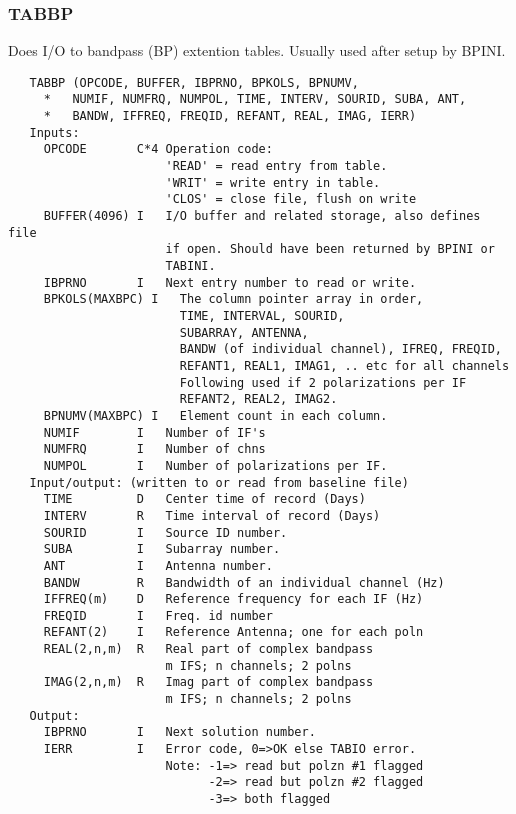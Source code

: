 \subsubsection{TABBP}
Does I/O to bandpass (BP) extention tables. Usually used after
setup by BPINI.
\begin{verbatim}
   TABBP (OPCODE, BUFFER, IBPRNO, BPKOLS, BPNUMV,
     *   NUMIF, NUMFRQ, NUMPOL, TIME, INTERV, SOURID, SUBA, ANT,
     *   BANDW, IFFREQ, FREQID, REFANT, REAL, IMAG, IERR)
   Inputs:
     OPCODE       C*4 Operation code:
                      'READ' = read entry from table.
                      'WRIT' = write entry in table.
                      'CLOS' = close file, flush on write
     BUFFER(4096) I   I/O buffer and related storage, also defines file
                      if open. Should have been returned by BPINI or
                      TABINI.
     IBPRNO       I   Next entry number to read or write.
     BPKOLS(MAXBPC) I   The column pointer array in order,
                        TIME, INTERVAL, SOURID,
                        SUBARRAY, ANTENNA,
                        BANDW (of individual channel), IFREQ, FREQID,
                        REFANT1, REAL1, IMAG1, .. etc for all channels
                        Following used if 2 polarizations per IF
                        REFANT2, REAL2, IMAG2.
     BPNUMV(MAXBPC) I   Element count in each column.
     NUMIF        I   Number of IF's
     NUMFRQ       I   Number of chns
     NUMPOL       I   Number of polarizations per IF.
   Input/output: (written to or read from baseline file)
     TIME         D   Center time of record (Days)
     INTERV       R   Time interval of record (Days)
     SOURID       I   Source ID number.
     SUBA         I   Subarray number.
     ANT          I   Antenna number.
     BANDW        R   Bandwidth of an individual channel (Hz)
     IFFREQ(m)    D   Reference frequency for each IF (Hz)
     FREQID       I   Freq. id number
     REFANT(2)    I   Reference Antenna; one for each poln
     REAL(2,n,m)  R   Real part of complex bandpass
                      m IFS; n channels; 2 polns
     IMAG(2,n,m)  R   Imag part of complex bandpass
                      m IFS; n channels; 2 polns
   Output:
     IBPRNO       I   Next solution number.
     IERR         I   Error code, 0=>OK else TABIO error.
                      Note: -1=> read but polzn #1 flagged
                            -2=> read but polzn #2 flagged
                            -3=> both flagged
\end{verbatim}

